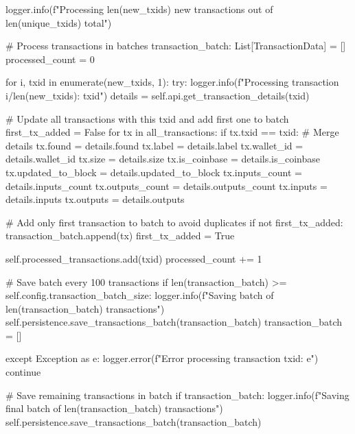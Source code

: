\begin{codelisting}[language=Python, caption=Основной скрипт сбора данных]
        logger.info(f"Processing {len(new_txids)} new transactions out of {len(unique_txids)} total")
        
        # Process transactions in batches
        transaction_batch: List[TransactionData] = []
        processed_count = 0
        
        for i, txid in enumerate(new_txids, 1):
            try:
                logger.info(f"Processing transaction {i}/{len(new_txids)}: {txid}")
                details = self.api.get_transaction_details(txid)
                
                # Update all transactions with this txid and add first one to batch
                first_tx_added = False
                for tx in all_transactions:
                    if tx.txid == txid:
                        # Merge details
                        tx.found = details.found
                        tx.label = details.label
                        tx.wallet_id = details.wallet_id
                        tx.size = details.size
                        tx.is_coinbase = details.is_coinbase
                        tx.updated_to_block = details.updated_to_block
                        tx.inputs_count = details.inputs_count
                        tx.outputs_count = details.outputs_count
                        tx.inputs = details.inputs
                        tx.outputs = details.outputs
                        
                        # Add only first transaction to batch to avoid duplicates
                        if not first_tx_added:
                            transaction_batch.append(tx)
                            first_tx_added = True
                
                self.processed_transactions.add(txid)
                processed_count += 1
                
                # Save batch every 100 transactions
                if len(transaction_batch) >= self.config.transaction_batch_size:
                    logger.info(f"Saving batch of {len(transaction_batch)} transactions")
                    self.persistence.save_transactions_batch(transaction_batch)
                    transaction_batch = []
                    
            except Exception as e:
                logger.error(f"Error processing transaction {txid}: {e}")
                continue
        
        # Save remaining transactions in batch
        if transaction_batch:
            logger.info(f"Saving final batch of {len(transaction_batch)} transactions")
            self.persistence.save_transactions_batch(transaction_batch)
                

\end{codelisting}
